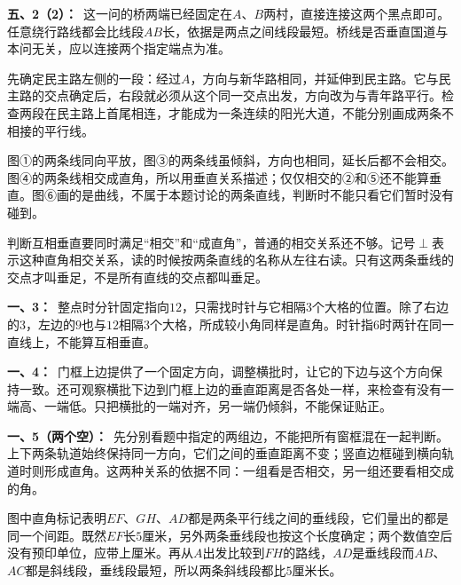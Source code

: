 \documentclass[multi=snippet,border=0pt]{standalone}
\newenvironment{snippet}[3]{\begin{minipage}{#1bp}\color{answerred}\fontsize{#2}{#3}\selectfont\raggedright}{\end{minipage}}
\begin{document}
\begin{snippet}{505}{11.5}{14}\textbf{五、2（2）：}\ 这一问的桥两端已经固定在\(A\)、\(B\)两村，直接连接这两个黑点即可。任意绕行路线都会比线段\(AB\)长，依据是两点之间线段最短。桥线是否垂直国道与本问无关，应以连接两个指定端点为准。\end{snippet}
\begin{snippet}{505}{11.5}{14}先确定民主路左侧的一段：经过\(A\)，方向与新华路相同，并延伸到民主路。它与民主路的交点确定后，右段就必须从这个同一交点出发，方向改为与青年路平行。检查两段在民主路上首尾相连，才能成为一条连续的阳光大道，不能分别画成两条不相接的平行线。\end{snippet}
\begin{snippet}{505}{11.5}{14}图①的两条线同向平放，图③的两条线虽倾斜，方向也相同，延长后都不会相交。图④的两条线相交成直角，所以用垂直关系描述；仅仅相交的②和⑤还不能算垂直。图⑥画的是曲线，不属于本题讨论的两条直线，判断时不能只看它们暂时没有碰到。\end{snippet}
\begin{snippet}{505}{11.5}{14}判断互相垂直要同时满足“相交”和“成直角”，普通的相交关系还不够。记号\(\perp\)表示这种直角相交关系，读的时候按两条直线的名称从左往右读。只有这两条垂线的交点才叫垂足，不是所有直线的交点都叫垂足。\end{snippet}
\begin{snippet}{505}{11.5}{14}\textbf{一、3：}\ 整点时分针固定指向\(12\)，只需找时针与它相隔\(3\)个大格的位置。除了右边的\(3\)，左边的\(9\)也与\(12\)相隔\(3\)个大格，所成较小角同样是直角。时针指\(6\)时两针在同一直线上，不能算互相垂直。\end{snippet}
\begin{snippet}{505}{11.5}{14}\textbf{一、4：}\ 门框上边提供了一个固定方向，调整横批时，让它的下边与这个方向保持一致。还可观察横批下边到门框上边的垂直距离是否各处一样，来检查有没有一端高、一端低。只把横批的一端对齐，另一端仍倾斜，不能保证贴正。\end{snippet}
\begin{snippet}{505}{11.5}{14}\textbf{一、5（两个空）：}\ 先分别看题中指定的两组边，不能把所有窗框混在一起判断。上下两条轨道始终保持同一方向，它们之间的垂直距离不变；竖直边框碰到横向轨道时则形成直角。这两种关系的依据不同：一组看是否相交，另一组还要看相交成的角。\end{snippet}
\begin{snippet}{505}{11.5}{14}图中直角标记表明\(EF\)、\(GH\)、\(AD\)都是两条平行线之间的垂线段，它们量出的都是同一个间距。既然\(EF\)长\(5\)厘米，另外两条垂线段也按这个长度确定；两个数值空后没有预印单位，应带上厘米。再从\(A\)出发比较到\(FH\)的路线，\(AD\)是垂线段而\(AB\)、\(AC\)都是斜线段，垂线段最短，所以两条斜线段都比\(5\)厘米长。\end{snippet}
\end{document}
